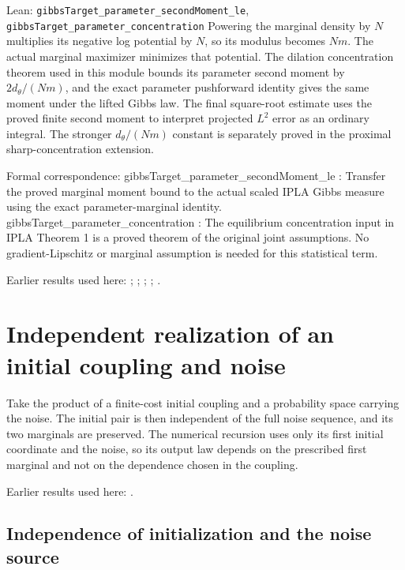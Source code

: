 \documentclass[11pt,a4paper]{report}
\begin{document}
\begin{leanbox}{Lean: \texttt{gibbsTarget\_\allowbreak{}parameter\_\allowbreak{}secondMoment\_\allowbreak{}le}, \texttt{gibbsTarget\_\allowbreak{}parameter\_\allowbreak{}concentration}}
Powering the marginal density by \(N\) multiplies its negative log potential by \(N\), so its modulus becomes \(Nm\). The actual marginal maximizer minimizes that potential. The dilation concentration theorem used in this module bounds its parameter second moment by \(2d_\theta/(Nm)\), and the exact parameter pushforward identity gives the same moment under the lifted Gibbs law. The final square-root estimate uses the proved finite second moment to interpret projected \(L^2\) error as an ordinary integral. The stronger \(d_\theta/(Nm)\) constant is separately proved in the proximal sharp-concentration extension.



Formal correspondence: gibbsTarget\_parameter\_secondMoment\_le : Transfer the proved marginal moment bound to the actual scaled IPLA Gibbs measure using the exact parameter-marginal identity. gibbsTarget\_parameter\_concentration : The equilibrium concentration input in IPLA Theorem 1 is a proved theorem of the original joint assumptions. No gradient-Lipschitz or marginal assumption is needed for this statistical term.
\end{leanbox}


Earlier results used here: \cite[Section~3.26.13]{LangevinLean2026ULASC}; \cite[Section~3.26.15]{LangevinLean2026ULASC}; \cite[Section~3.26.3]{LangevinLean2026ULASC}; \cite[Section~3.48.1]{LangevinLean2026ULASC}; \cite[Section~3.48.8]{LangevinLean2026ULASC}.
\section{\texorpdfstring{Independent realization of an initial coupling and noise}{Independent realization of an initial coupling and noise}}
\label{proof-module-IPLA-ProductReference-lean}


Take the product of a finite-cost initial coupling and a probability space carrying the noise. The initial pair is then independent of the full noise sequence, and its two marginals are preserved. The numerical recursion uses only its first initial coordinate and the noise, so its output law depends on the prescribed first marginal and not on the dependence chosen in the coupling.




Earlier results used here: \cite[Section~3.23]{LangevinLean2026ULASC}.
\subsection{\texorpdfstring{Independence of initialization and the noise source}{Independence of initialization and the noise source}}
\label{report-step-IPLA-ProductReference-lean-1}
\end{document}
